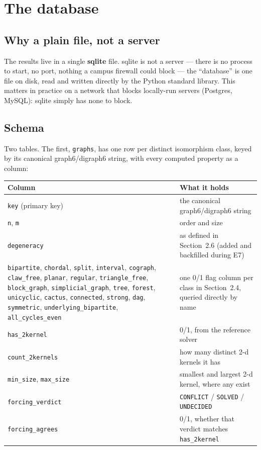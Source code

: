 \documentclass[11pt]{article}
\theoremstyle{plain}
\theoremstyle{definition}
\theoremstyle{remark}
\begin{document}
\section{The database}
\label{sec:db}

\subsection{Why a plain file, not a server}

The results live in a single \textbf{sqlite} file. sqlite is not a server — there is no
process to start, no port, nothing a campus firewall could block — the ``database'' is
one file on disk, read and written directly by the Python standard library. This
matters in practice on a network that blocks locally-run servers (Postgres, MySQL):
sqlite simply has none to block.

\subsection{Schema}

Two tables. The first, \texttt{graphs}, has one row per distinct isomorphism class,
keyed by its canonical graph6/digraph6 string, with every computed property as a
column:

\begin{center}
\begin{tabular}{@{}p{3.6cm}p{10cm}@{}}
\toprule
\textbf{Column} & \textbf{What it holds} \\
\midrule
\texttt{key} (primary key) & the canonical graph6/digraph6 string \\
\texttt{n}, \texttt{m} & order and size \\
\texttt{degeneracy} & as defined in Section~2.6 (added and backfilled during E7) \\
\texttt{bipartite}, \texttt{chordal}, \texttt{split}, \texttt{interval}, \texttt{cograph}, \texttt{claw\_free}, \texttt{planar}, \texttt{regular}, \texttt{triangle\_free}, \texttt{block\_graph}, \texttt{simplicial\_graph}, \texttt{tree}, \texttt{forest}, \texttt{unicyclic}, \texttt{cactus}, \texttt{connected}, \texttt{strong}, \texttt{dag}, \texttt{symmetric}, \texttt{underlying\_bipartite}, \texttt{all\_cycles\_even} & one 0/1 flag column per class in Section~2.4, queried directly by name \\
\texttt{has\_2kernel} & 0/1, from the reference solver \\
\texttt{count\_2kernels} & how many distinct 2-d kernels it has \\
\texttt{min\_size}, \texttt{max\_size} & smallest and largest 2-d kernel, where any exist \\
\texttt{forcing\_verdict} & \texttt{CONFLICT} / \texttt{SOLVED} / \texttt{UNDECIDED} \\
\texttt{forcing\_agrees} & 0/1, whether that verdict matches \texttt{has\_2kernel} \\
\bottomrule
\end{tabular}
\end{center}
\end{document}
